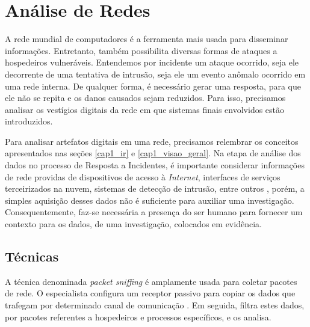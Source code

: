 \section{Análise de Redes}
    
    \vspace{10.5cm}
    
    \hspace{1cm}
    A rede mundial de computadores é a ferramenta mais usada para disseminar informações. Entretanto, também possibilita diversas formas de ataques a hospedeiros vulneráveis. Entendemos por incidente um ataque ocorrido, seja ele decorrente de uma tentativa de intrusão, seja ele um evento anômalo ocorrido em uma rede interna. De qualquer forma, é necessário gerar uma resposta, para que ele não se repita e os danos causados sejam reduzidos. Para isso, precisamos analisar os vestígios digitais da rede em que sistemas finais envolvidos estão introduzidos.
    
    \vspace{4mm}
    
    \hspace{1cm}
    Para analisar artefatos digitais em uma rede, precisamos relembrar os conceitos apresentados nas seções \ref{cap1_ir} e \ref{cap1_visao_geral}. Na etapa de análise dos dados no processo de Resposta a Incidentes, é importante considerar informações de rede providas de dispositivos de acesso à \textit{Internet}, interfaces de serviços terceirizados na nuvem, sistemas de detecção de intrusão, entre outros \cite{luttgens2014}, porém, a simples aquisição desses dados não é suficiente para auxiliar uma investigação. Consequentemente, faz-se necessária a presença do ser humano para fornecer um contexto para os dados, de uma investigação, colocados em evidência.
    
    \subsection{Técnicas}
    
    \hspace{1cm}
    A técnica denominada \textit{packet sniffing} é amplamente usada para coletar pacotes de rede. O especialista configura um receptor passivo para copiar os dados que trafegam por determinado canal de comunicação \cite{kurose2013}. Em seguida, filtra estes dados, por pacotes referentes a hospedeiros e processos específicos, e os analisa.
    
    \vspace{4mm}
    
